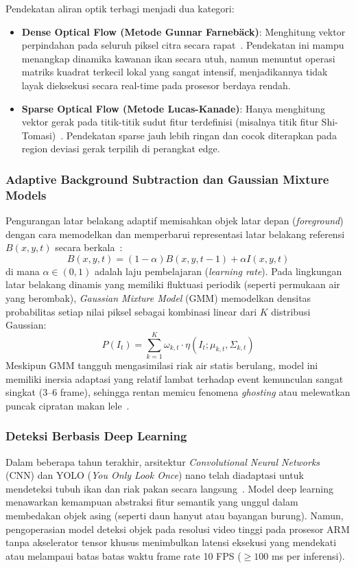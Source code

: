 Pendekatan aliran optik terbagi menjadi dua kategori:
\begin{itemize}
    \item \textbf{Dense Optical Flow (Metode Gunnar Farnebäck)}: Menghitung vektor perpindahan pada seluruh piksel citra secara rapat~\cite{Fukae2023}. Pendekatan ini mampu menangkap dinamika kawanan ikan secara utuh, namun menuntut operasi matriks kuadrat terkecil lokal yang sangat intensif, menjadikannya tidak layak dieksekusi secara real-time pada prosesor berdaya rendah.
    \item \textbf{Sparse Optical Flow (Metode Lucas-Kanade)}: Hanya menghitung vektor gerak pada titik-titik sudut fitur terdefinisi (misalnya titik fitur Shi-Tomasi)~\cite{Zhang2024}. Pendekatan sparse jauh lebih ringan dan cocok diterapkan pada region deviasi gerak terpilih di perangkat edge.
\end{itemize}

\subsubsection{Adaptive Background Subtraction dan Gaussian Mixture Models}
Pengurangan latar belakang adaptif memisahkan objek latar depan (\textit{foreground}) dengan cara memodelkan dan memperbarui representasi latar belakang referensi $B(x,y,t)$ secara berkala~\cite{Aris2023}:
\begin{equation}
    B(x,y,t) = (1 - \alpha) B(x,y,t-1) + \alpha I(x,y,t)
    \label{eq:running-average}
\end{equation}
di mana $\alpha \in (0,1)$ adalah laju pembelajaran (\textit{learning rate}). Pada lingkungan latar belakang dinamis yang memiliki fluktuasi periodik (seperti permukaan air yang berombak), \textit{Gaussian Mixture Model} (GMM) memodelkan densitas probabilitas setiap nilai piksel sebagai kombinasi linear dari $K$ distribusi Gaussian:
\begin{equation}
    P(I_t) = \sum_{k=1}^K \omega_{k,t} \cdot \eta(I_t; \mu_{k,t}, \Sigma_{k,t})
    \label{eq:gmm}
\end{equation}
Meskipun GMM tangguh mengasimilasi riak air statis berulang, model ini memiliki inersia adaptasi yang relatif lambat terhadap event kemunculan sangat singkat (3--6 frame), sehingga rentan memicu fenomena \textit{ghosting} atau melewatkan puncak cipratan makan lele~\cite{Aris2023}.

\subsubsection{Deteksi Berbasis Deep Learning}
Dalam beberapa tahun terakhir, arsitektur \textit{Convolutional Neural Networks} (CNN) dan YOLO (\textit{You Only Look Once}) nano telah diadaptasi untuk mendeteksi tubuh ikan dan riak pakan secara langsung~\cite{Qian2025,Vijayalakshmi2025}. Model deep learning menawarkan kemampuan abstraksi fitur semantik yang unggul dalam membedakan objek asing (seperti daun hanyut atau bayangan burung). Namun, pengoperasian model deteksi objek pada resolusi video tinggi pada prosesor ARM tanpa akselerator tensor khusus menimbulkan latensi eksekusi yang mendekati atau melampaui batas batas waktu frame rate 10 FPS ($\ge 100$ ms per inferensi).

